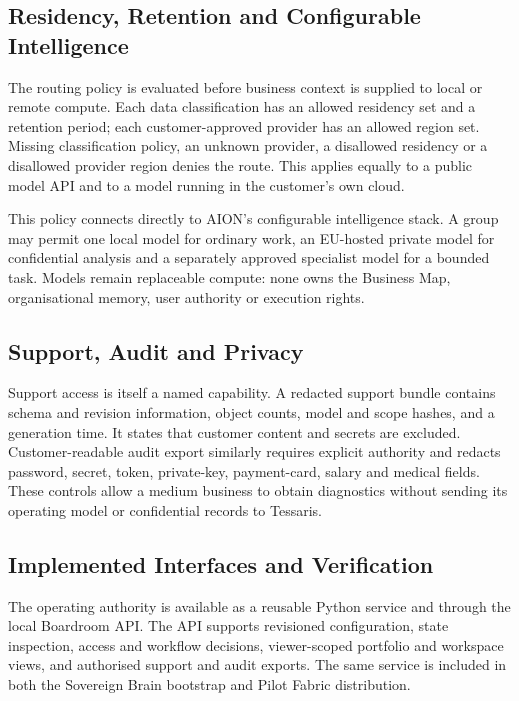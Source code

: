 \subsection{Residency, Retention and Configurable Intelligence}

The routing policy is evaluated before business context is supplied to local or remote
compute.  Each data classification has an allowed residency set and a retention period;
each customer-approved provider has an allowed region set.  Missing classification policy,
an unknown provider, a disallowed residency or a disallowed provider region denies the route.
This applies equally to a public model API and to a model running in the customer's own cloud.

This policy connects directly to AION's configurable intelligence stack.  A group may permit
one local model for ordinary work, an EU-hosted private model for confidential analysis and a
separately approved specialist model for a bounded task.  Models remain replaceable compute:
none owns the Business Map, organisational memory, user authority or execution rights.

\subsection{Support, Audit and Privacy}

Support access is itself a named capability.  A redacted support bundle contains schema and
revision information, object counts, model and scope hashes, and a generation time.  It states
that customer content and secrets are excluded.  Customer-readable audit export similarly
requires explicit authority and redacts password, secret, token, private-key, payment-card,
salary and medical fields.  These controls allow a medium business to obtain diagnostics
without sending its operating model or confidential records to Tessaris.

\subsection{Implemented Interfaces and Verification}

The operating authority is available as a reusable Python service and through the local
Boardroom API.  The API supports revisioned configuration, state inspection, access and
workflow decisions, viewer-scoped portfolio and workspace views, and authorised support and
audit exports.  The same service is included in both the Sovereign Brain bootstrap and Pilot
Fabric distribution.

